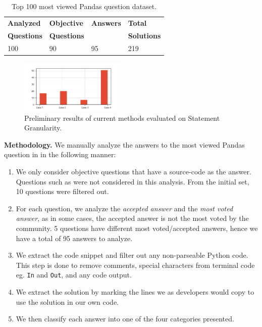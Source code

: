 \begin{table}[b]
\label{tab:pandas-top100-analysis}
\caption{Top 100 most viewed Pandas question dataset.}
\begin{tabular}{l l l l}
		 \textbf{Analyzed} 		& \textbf{Objective} 		& \textbf{Answers} 	& \textbf{Total}		\\ 
         \textbf{Questions}		& \textbf{Questions}		&					& \textbf{Solutions}	\\ \hline
		 	100						& 90					& 95				& 219					\\ 

\end{tabular}
\end{table}

\begin{figure}[tbh]
\label{fig:pandas-top100-analysis}
\caption{}
\centering
\includegraphics[width=0.45\textwidth]{figures/dataset_cases}
\caption{Preliminary results of current methods evaluated on Statement Granularity.}
\label{fig:dataset-cases}
\end{figure}



\textbf{Methodology.} We manually analyze the answers to the most viewed Pandas question in \stackoverflow in the following manner:
\begin{enumerate}
	\item We only consider objective questions that have a source-code as the answer. Questions such as  were not considered in this analysis. From the initial set, 10 questions were filtered out. 
	\item For each question, we analyze the \textit{accepted answer} and the \textit{most voted answer}, as in some cases, the accepted answer is not the most voted by the community. 5 questions have different most voted/accepted answers, hence we have a total of 95 answers to analyze.
    \item We extract the code snippet and filter out any non-parseable Python code. This step is done to remove comments, special characters from terminal code eg. \texttt{In} and \texttt{Out}, and any code output.
    \item We extract the solution by marking the lines we as developers would copy to use the solution in our own code. 
    \item We then classify each answer into one of the four categories presented.
\end{enumerate}

